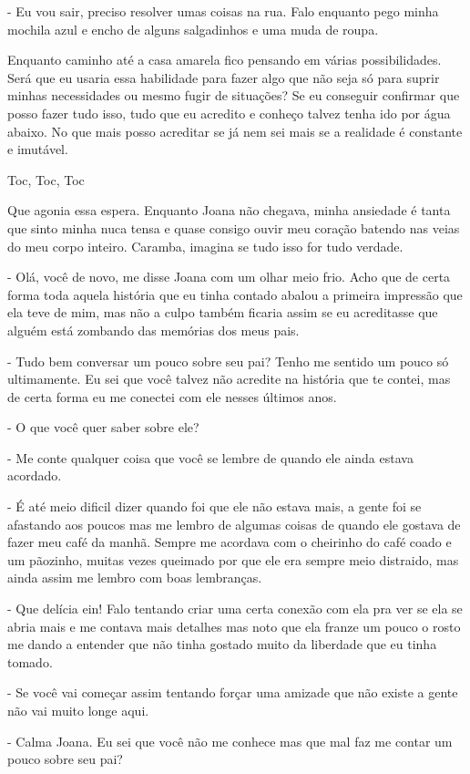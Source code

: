 - Eu vou sair, preciso resolver umas coisas na rua. Falo enquanto pego minha mochila azul e encho de alguns salgadinhos e uma muda de roupa.

Enquanto caminho até a casa amarela fico pensando em várias possibilidades. Será que eu usaria essa habilidade para fazer algo que não seja só para suprir minhas necessidades ou mesmo fugir de situações? Se eu conseguir confirmar que posso fazer tudo isso, tudo que eu acredito e conheço talvez tenha ido por água abaixo. No que mais posso acreditar se já nem sei mais se a realidade é constante e imutável.

Toc, Toc, Toc

Que agonia essa espera. Enquanto Joana não chegava, minha ansiedade é tanta que sinto minha nuca tensa e quase consigo ouvir meu coração batendo nas veias do meu corpo inteiro. Caramba, imagina se tudo isso for tudo verdade.

- Olá, você de novo, me disse Joana com um olhar meio frio. Acho que de certa forma toda aquela história que eu tinha contado abalou a primeira impressão que ela teve de mim, mas não a culpo também ficaria assim se eu acreditasse que alguém está zombando das memórias dos meus pais.

- Tudo bem conversar um pouco sobre seu pai? Tenho me sentido um pouco só ultimamente. Eu sei que você talvez não acredite na história que te contei, mas de certa forma eu me conectei com ele nesses últimos anos.

- O que você quer saber sobre ele?

- Me conte qualquer coisa que você se lembre de quando ele ainda estava acordado.

- É até meio dificil dizer quando foi que ele não estava mais, a gente foi se afastando aos poucos mas me lembro de algumas coisas de quando ele gostava de fazer meu café da manhã. Sempre me acordava com o cheirinho do café coado e um pãozinho, muitas vezes queimado por que ele era sempre meio distraido, mas ainda assim me lembro com boas lembranças.

- Que delícia ein! Falo tentando criar uma certa conexão com ela pra ver se ela se abria mais e me contava mais detalhes mas noto que ela franze um pouco o rosto me dando a entender que não tinha gostado muito da liberdade que eu tinha tomado.

- Se você vai começar assim tentando forçar uma amizade que não existe a gente não vai muito longe aqui.

- Calma Joana. Eu sei que você não me conhece mas que mal faz me contar um pouco sobre seu pai?

